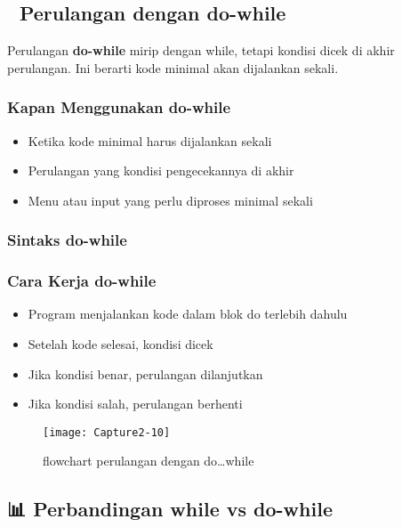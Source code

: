 \subsection{🔄 Perulangan dengan do-while}\label{perulangan-dengan-do-while}

Perulangan \textbf{do-while} mirip dengan while, tetapi kondisi dicek di akhir perulangan. Ini berarti kode minimal akan dijalankan sekali.

\subsubsection{Kapan Menggunakan do-while}

\begin{itemize}
\item Ketika kode minimal harus dijalankan sekali
\item Perulangan yang kondisi pengecekannya di akhir
\item Menu atau input yang perlu diproses minimal sekali
\end{itemize}

\subsubsection{Sintaks do-while}



\subsubsection{Cara Kerja do-while}

\begin{itemize}
\item Program menjalankan kode dalam blok do terlebih dahulu
\item Setelah kode selesai, kondisi dicek
\item Jika kondisi benar, perulangan dilanjutkan
\item Jika kondisi salah, perulangan berhenti
\end{itemize}

\begin{figure}[htbp]
\centering
\texttt{[image: Capture2-10]}
\caption{flowchart perulangan dengan do\dots while}
\end{figure}

\subsection{📊 Perbandingan while vs do-while}

